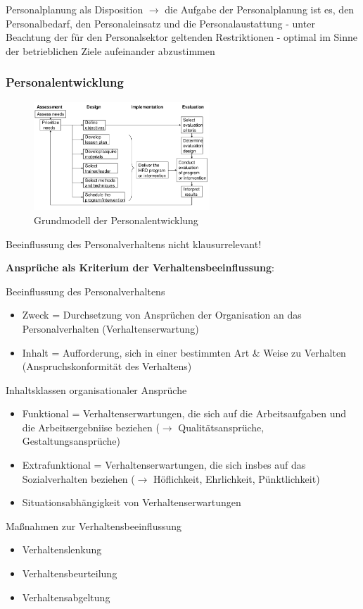 \documentclass[11pt]{article}
\begin{document}
Personalplanung als Disposition \(\rightarrow\) die Aufgabe der Personalplanung ist es, den Personalbedarf, den Personaleinsatz und die Personalaustattung - unter Beachtung der für den Personalsektor geltenden Restriktionen - optimal im Sinne der betrieblichen Ziele aufeinander abzustimmen
\subsubsection{Personalentwicklung}
\label{sec:orga62e0c5}
\begin{figure}[htbp]
\centering
\includegraphics[width=250px]{./pictures/persgruent.png}
\caption{Grundmodell der Personalentwicklung}
\end{figure} 

Beeinflussung des Personalverhaltens nicht klausurrelevant!

\textbf{Ansprüche als Kriterium der Verhaltensbeeinflussung}:

Beeinflussung des Personalverhaltens
\begin{itemize}
\item Zweck = Durchsetzung von Ansprüchen der Organisation an das Personalverhalten (Verhaltenserwartung)
\item Inhalt = Aufforderung, sich in einer bestimmten Art \& Weise zu Verhalten (Anspruchskonformität des Verhaltens)
\end{itemize}

Inhaltsklassen organisationaler Ansprüche
\begin{itemize}
\item Funktional = Verhaltenserwartungen, die sich auf die Arbeitsaufgaben und die Arbeitsergebniise beziehen (\(\rightarrow\) Qualitätsansprüche, Gestaltungsansprüche)
\item Extrafunktional = Verhaltenserwartungen, die sich insbes auf das Sozialverhalten beziehen (\(\rightarrow\) Höflichkeit, Ehrlichkeit, Pünktlichkeit)
\item Situationsabhängigkeit von Verhaltenserwartungen
\end{itemize}

Maßnahmen zur Verhaltensbeeinflussung
\begin{itemize}
\item Verhaltenslenkung
\item Verhaltensbeurteilung
\item Verhaltensabgeltung
\end{itemize}
\end{document}

